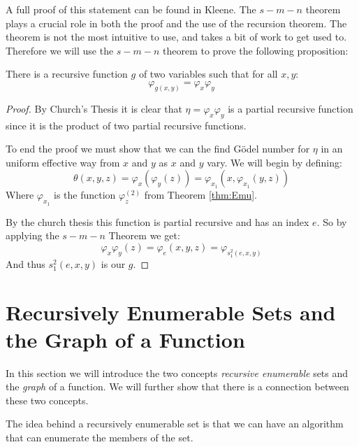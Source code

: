 \documentclass[../main.tex]{subfiles}
\begin{document}
A full proof of this statement can be found in Kleene. The $s-m-n$ theorem
plays a crucial role in both the proof and the use of the recursion theorem.
The theorem is not the most intuitive to use, and takes a bit of work to get
used to. Therefore we will use the $s-m-n$ theorem to
prove the following proposition:
\begin{prop}
	There is a recursive function $g$ of two variables such that for all
	$x,y$:
\[\varphi_{g(x,y)}=\varphi_x\varphi_y\]
\end{prop}
\begin{proof}
	By Church's Thesis it is clear that $\eta=\varphi_x\varphi_y$ is a
	partial recursive function since it is the product of two partial
	recursive functions.

	To end the proof we must show that we can the find Gödel number for $\eta$
	in an uniform effective way from $x$ and $y$ as $x$ and $y$ vary. We
	will begin by defining:
	\[\theta(x,y,z)=\varphi_x(\varphi_y(z))=\varphi_{x_1}(x,\varphi_{x_1}(y,z))\]
	Where $\varphi_{x_1}$ is the function $\varphi_z^{(2)}$ from Theorem
	\ref{thm:Emu}.

	By the church thesis this function is partial recursive
	and has an index $e$. So by applying the $s-m-n$ Theorem we get:
	\[\varphi_x\varphi_y(z)=
	\varphi_e(x,y,z)=\varphi_{s_1^2(e,x,y)}\]
	And thus $s_1^2(e,x,y)$ is our $g$.
\end{proof}

\section{Recursively Enumerable Sets and the Graph of a Function}
In this section we will introduce the two concepts \textit{recursive
enumerable} sets and the \textit{graph} of a function. We will further show
that there is a connection between these two concepts.

The idea behind a recursively enumerable set is that we can have an algorithm
that can enumerate the members of the set.
\end{document}
